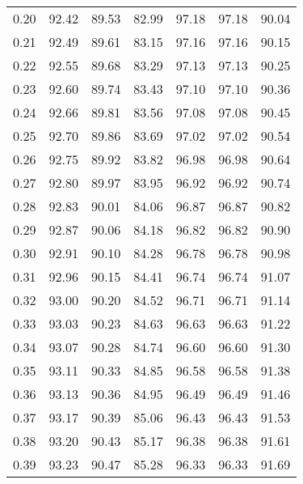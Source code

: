 \begin{tabular}{|c|c|c|c|c|c|c|}
      0.20 &     92.42 &     89.53 &      82.99 &   97.18 &      97.18 &         90.04 \\
      0.21 &     92.49 &     89.61 &      83.15 &   97.16 &      97.16 &         90.15 \\
      0.22 &     92.55 &     89.68 &      83.29 &   97.13 &      97.13 &         90.25 \\
      0.23 &     92.60 &     89.74 &      83.43 &   97.10 &      97.10 &         90.36 \\
      0.24 &     92.66 &     89.81 &      83.56 &   97.08 &      97.08 &         90.45 \\
      0.25 &     92.70 &     89.86 &      83.69 &   97.02 &      97.02 &         90.54 \\
      0.26 &     92.75 &     89.92 &      83.82 &   96.98 &      96.98 &         90.64 \\
      0.27 &     92.80 &     89.97 &      83.95 &   96.92 &      96.92 &         90.74 \\
      0.28 &     92.83 &     90.01 &      84.06 &   96.87 &      96.87 &         90.82 \\
      0.29 &     92.87 &     90.06 &      84.18 &   96.82 &      96.82 &         90.90 \\
      0.30 &     92.91 &     90.10 &      84.28 &   96.78 &      96.78 &         90.98 \\
      0.31 &     92.96 &     90.15 &      84.41 &   96.74 &      96.74 &         91.07 \\
      0.32 &     93.00 &     90.20 &      84.52 &   96.71 &      96.71 &         91.14 \\
      0.33 &     93.03 &     90.23 &      84.63 &   96.63 &      96.63 &         91.22 \\
      0.34 &     93.07 &     90.28 &      84.74 &   96.60 &      96.60 &         91.30 \\
      0.35 &     93.11 &     90.33 &      84.85 &   96.58 &      96.58 &         91.38 \\
      0.36 &     93.13 &     90.36 &      84.95 &   96.49 &      96.49 &         91.46 \\
      0.37 &     93.17 &     90.39 &      85.06 &   96.43 &      96.43 &         91.53 \\
      0.38 &     93.20 &     90.43 &      85.17 &   96.38 &      96.38 &         91.61 \\
      0.39 &     93.23 &     90.47 &      85.28 &   96.33 &      96.33 &         91.69 \\

\end{tabular}
